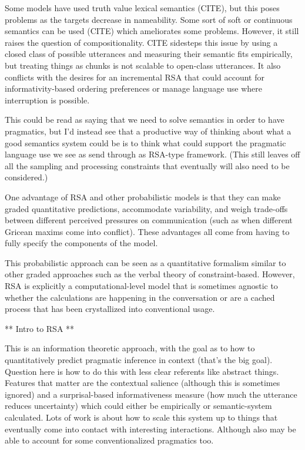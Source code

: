\documentclass[]{article}
\begin{document}
Some models have used truth value lexical semantics (CITE), but this poses problems as the targets decrease in nameability. Some sort of soft or continuous semantics can be used (CITE) which ameliorates some problems. However, it still raises the question of compositionality. CITE sidesteps this issue by using a closed class of possible utterances and measuring their semantic fits empirically, but treating things as chunks is not scalable to open-class utterances. It also conflicts with the desires for an incremental RSA that could account for informativity-based ordering preferences or manage language use where interruption is possible. 

This could be read as saying that we need to solve semantics in order to have pragmatics, but I'd instead see that a productive way of thinking about what a good semantics system could be is to think what could support the pragmatic language use we see as send through as RSA-type framework. (This still leaves off all the sampling and processing constraints that eventually will also need to be considered.) 

One advantage of RSA and other probabilistic models is that they can make graded quantitative predictions, accommodate variability, and weigh trade-offs between different perceived pressures on communication (such as when different Gricean maxims come into conflict). These advantages all come from having to fully specify the components of the model. 

This probabilistic approach can be seen as a quantitative formalism similar to other graded approaches such as the verbal theory of constraint-based. However, RSA is explicitly a computational-level model that is sometimes agnostic to whether the calculations are happening in the conversation or are a cached process that has been crystallized into conventional usage. 

** Intro to RSA ** 


\cite{frank2012a} This is an information theoretic approach, with the goal as to how to quantitatively predict pragmatic inference in context (that's the big goal). Question here is how to do this with less clear referents like abstract things. Features that matter are the contextual salience (although this is sometimes ignored) and a surprisal-based informativeness measure (how much the utterance reduces uncertainty) which could either be empirically or semantic-system calculated. Lots of work is about how to scale this system up to things that eventually come into contact with interesting interactions. Although also may be able to account for some conventionalized pragmatics too. 
\end{document}
